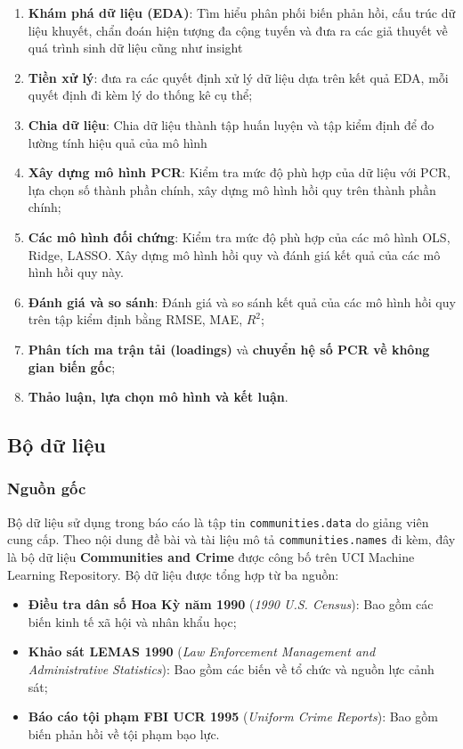 \begin{enumerate}
\def\labelenumi{\arabic{enumi}.}
\tightlist
\item
  \textbf{Khám phá dữ liệu (EDA)}: Tìm hiểu phân phối biến phản hồi, cấu
  trúc dữ liệu khuyết, chẩn đoán hiện tượng đa cộng tuyến và đưa ra các
  giả thuyết về quá trình sinh dữ liệu cũng như insight
\item
  \textbf{Tiền xử lý}: đưa ra các quyết định xử lý dữ liệu dựa trên kết
  quả EDA, mỗi quyết định đi kèm lý do thống kê cụ thể;
\item
  \textbf{Chia dữ liệu}: Chia dữ liệu thành tập huấn luyện và tập kiểm
  định để đo lường tính hiệu quả của mô hình
\item
  \textbf{Xây dựng mô hình PCR}: Kiểm tra mức độ phù hợp của dữ liệu với
  PCR, lựa chọn số thành phần chính, xây dựng mô hình hồi quy trên thành
  phần chính;
\item
  \textbf{Các mô hình đối chứng}: Kiểm tra mức độ phù hợp của các mô
  hình OLS, Ridge, LASSO. Xây dựng mô hình hồi quy và đánh giá kết quả
  của các mô hình hồi quy này.
\item
  \textbf{Đánh giá và so sánh}: Đánh giá và so sánh kết quả của các mô
  hình hồi quy trên tập kiểm định bằng RMSE, MAE, \(R^2\);
\item
  \textbf{Phân tích ma trận tải (loadings)} và \textbf{chuyển hệ số PCR
  về không gian biến gốc};
\item
  \textbf{Thảo luận, lựa chọn mô hình và kết luận}.
\end{enumerate}

\subsection{Bộ dữ liệu}\label{bux1ed9-dux1eef-liux1ec7u}

\subsubsection{Nguồn gốc}\label{nguux1ed3n-gux1ed1c}

Bộ dữ liệu sử dụng trong báo cáo là tập tin \texttt{communities.data} do
giảng viên cung cấp. Theo nội dung đề bài và tài liệu mô tả
\texttt{communities.names} đi kèm, đây là bộ dữ liệu \textbf{Communities
and Crime} được công bố trên UCI Machine Learning Repository. Bộ dữ liệu
được tổng hợp từ ba nguồn:

\begin{itemize}
\tightlist
\item
  \textbf{Điều tra dân số Hoa Kỳ năm 1990} (\emph{1990 U.S. Census}):
  Bao gồm các biến kinh tế xã hội và nhân khẩu học;
\item
  \textbf{Khảo sát LEMAS 1990} (\emph{Law Enforcement Management and
  Administrative Statistics}): Bao gồm các biến về tổ chức và nguồn lực
  cảnh sát;
\item
  \textbf{Báo cáo tội phạm FBI UCR 1995} (\emph{Uniform Crime Reports}):
  Bao gồm biến phản hồi về tội phạm bạo lực.
\end{itemize}

